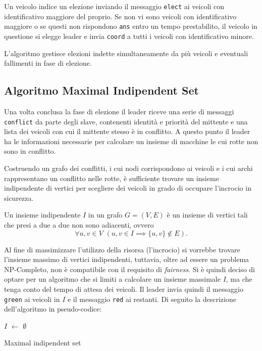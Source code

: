 \documentclass{memoir}
\begin{document}
Un veicolo indice un elezione inviando il messaggio \texttt{elect} ai veicoli
con identificativo maggiore del proprio. Se non vi sono veicoli con
identificativo maggiore o se questi non rispondono \texttt{ans} entro un tempo
prestabilito, il veicolo in questione si elegge leader e invia \texttt{coord} a
tutti i veicoli con identificativo minore.

L'algoritmo gestisce elezioni indette simultaneamente da più veicoli e eventuali
fallimenti in fase di elezione.

\subsection{Algoritmo Maximal Indipendent Set}
Una volta conclusa la fase di elezione il leader riceve una serie di messaggi
\texttt{conflict} da parte degli slave, contenenti identità e priorità del
mittente e una lista dei veicoli con cui il mittente stesso è in conflitto. A
questo punto il leader ha le informazioni necessarie per calcolare un insieme di
macchine le cui rotte non sono in conflitto.

Costruendo un grafo dei conflitti, i cui nodi corrispondono ai veicoli e i cui
archi rappresentano un conflitto nelle rotte, è sufficiente trovare un insieme
indipendente di vertici per scegliere dei veicoli in grado di occupare
l'incrocio in sicurezza.

Un insieme indipendente $I$ in un grafo $G=(V,E)$ è un insieme di vertici tali
che presi a due a due non sono adiacenti, ovvero
\[\forall u,v \in V \, \, (u, v \in I \implies \{u,v\} \not\in E).\]

Al fine di massimizzare l'utilizzo della risorsa (l'incrocio) si vorrebbe
trovare l'insieme massimo di vertici indipendenti, tuttavia, oltre ad essere un
problema NP-Completo, non è compatibile con il requisito di \emph{fairness}. Si
è quindi deciso di optare per un algoritmo che si limiti a calcolare un insieme
massimale $I$, ma che tenga conto del tempo di attesa dei veicoli. Il leader
invia quindi il messaggio \texttt{green} ai veicoli in $I$ e il messaggio
\texttt{red} ai restanti. Di seguito la descrizione dell'algoritmo in
pseudo-codice:

\begin{algorithm}

\SetAlgoLined
{}
$I$ $\leftarrow$ $\emptyset$\;
\;
\caption{Maximal indipendent set}
\end{algorithm}
\end{document}
